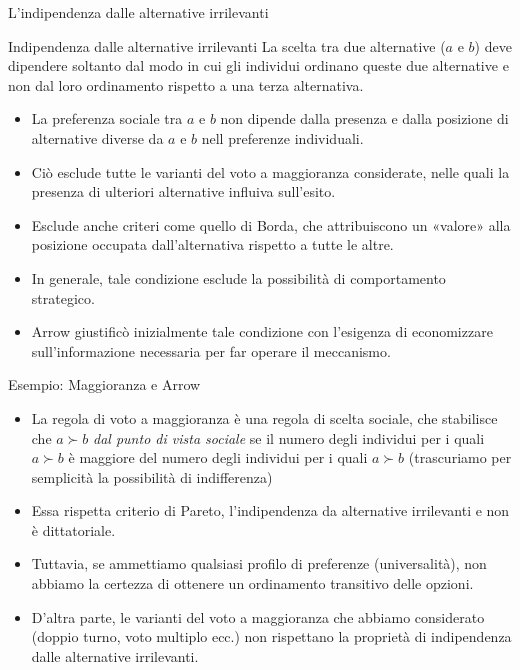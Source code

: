 \documentclass[aspectratio=64,12pt]{beamer}
\begin{document}
\begin{frame}{L'indipendenza dalle alternative irrilevanti}
\begin{resize}{.95}
\begin{block}{Indipendenza dalle alternative irrilevanti}
La scelta tra due alternative ($a$ e $b$) deve dipendere \alert{soltanto} dal modo
in cui gli individui ordinano queste due alternative e non dal loro
ordinamento rispetto a una terza alternativa.
\end{block}

\begin{itemize}
\item La preferenza sociale tra $a$ e $b$ non dipende dalla presenza e dalla
posizione di alternative diverse da $a$ e $b$ nell preferenze individuali.
\item Ciò esclude tutte le varianti del voto a maggioranza considerate, nelle
quali la presenza di ulteriori alternative influiva sull'esito.
\item Esclude anche criteri come quello di Borda, che attribuiscono un «valore»
alla posizione occupata dall'alternativa rispetto a tutte le altre.
\item In generale, tale condizione esclude la possibilità di comportamento
strategico.
\item Arrow giustificò inizialmente tale condizione con l'esigenza di economizzare
sull'informazione necessaria per far operare il meccanismo.
\end{itemize}
\end{resize}
\end{frame}

\begin{frame}{Esempio: Maggioranza e Arrow}
\begin{itemize}
\item La regola di voto a maggioranza è una regola di scelta sociale, che
stabilisce che $a\succ b$ \emph{dal punto di vista sociale} se il numero degli
individui per i quali $a\succ b$ è maggiore del numero degli individui per i
quali $a\succ b$ (trascuriamo per semplicità la possibilità di indifferenza)
\item Essa rispetta criterio di Pareto, l'indipendenza da alternative irrilevanti
e non è dittatoriale.
\item Tuttavia, se ammettiamo qualsiasi profilo di preferenze (universalità), non
abbiamo la certezza di ottenere un ordinamento transitivo delle opzioni.
\item D'altra parte, le varianti del voto a maggioranza che abbiamo
  considerato (doppio turno, voto multiplo ecc.) non rispettano la proprietà
  di indipendenza dalle alternative irrilevanti.
\end{itemize}
\end{frame}
\end{document}

